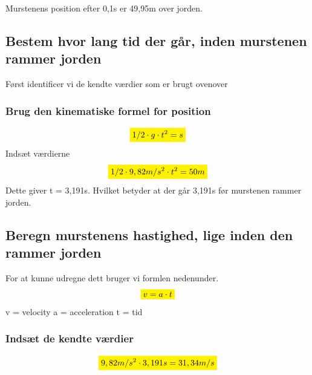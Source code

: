 Murstenens position efter 0,1s er 49,95m over jorden.

\subsection{Bestem hvor lang tid der går, inden murstenen rammer jorden}

Først identificer vi de kendte værdier som er brugt ovenover

\subsubsection{Brug den kinematiske formel for position}
\begin{equation*}
    \mathcolorbox{yellow}{1/2\cdot g\cdot t^{2}=s}
\end{equation*}
Indsæt værdierne
\begin{equation*}
    \mathcolorbox{yellow}{1/2\cdot9,82m/s^{2}\cdot t^{2}=50m}
\end{equation*}
Dette giver t = 3,191s. Hvilket betyder at der går 3,191s før murstenen rammer jorden.

\subsection{Beregn murstenens hastighed, lige inden den rammer jorden}
For at kunne udregne dett bruger vi formlen nedenunder.
\begin{equation*}
    \mathcolorbox{yellow}{v=a\cdot t}
\end{equation*}
v = velocity\newline
a = acceleration\newline
t = tid
\subsubsection{Indsæt de kendte værdier}
\begin{equation*}
    \mathcolorbox{yellow}{9,82m/s^{2}\cdot 3,191s = 31,34 m/s}
\end{equation*}


\newpage